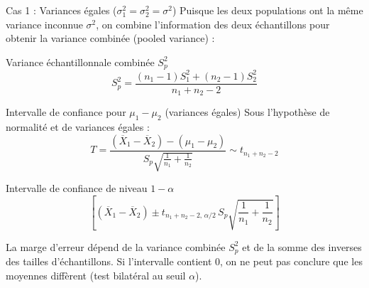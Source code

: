 \documentclass{BeamerTemplate}
\begin{document}
\begin{frame}[t]{Cas 1 : Variances égales ($\sigma_1^2 = \sigma_2^2 = \sigma^2$)}
  Puisque les deux populations ont la même variance inconnue $\sigma^2$, on combine l'information des deux échantillons pour obtenir la \alert{variance combinée} (pooled variance) :

  \begin{Boite}{Variance échantillonnale combinée $S_p^2$}
    $$S_p^2 = \frac{(n_1 - 1)S_1^2 + (n_2 - 1)S_2^2}{n_1 + n_2 - 2}$$
  \end{Boite}

\end{frame}

\begin{frame}[t]{Intervalle de confiance pour $\mu_1 - \mu_2$ (variances égales)}
  Sous l'hypothèse de normalité et de variances égales :
  \[
    T = \frac{(\overline{X}_1 - \overline{X}_2) - (\mu_1 - \mu_2)}{S_p \sqrt{\frac{1}{n_1} + \frac{1}{n_2}}} \sim t_{n_1 + n_2 - 2}
  \]

  \bigskip
  \begin{Boite}{Intervalle de confiance de niveau $1-\alpha$}
    \[
      \left[ (\overline{X}_1 - \overline{X}_2) \pm t_{n_1+n_2-2,\, \alpha/2} \, S_p \sqrt{\frac{1}{n_1} + \frac{1}{n_2}} \right]
    \]
  \end{Boite}

  \medskip
  La marge d'erreur dépend de la variance combinée $S_p^2$ et de la somme des inverses des tailles d'échantillons.
  Si l'intervalle \alert{contient 0}, on ne peut pas conclure que les moyennes diffèrent (test bilatéral au seuil $\alpha$).
\end{frame}
\end{document}
